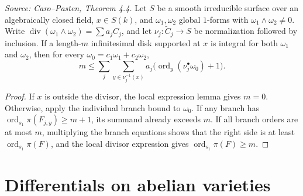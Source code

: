\begin{theorem}
  \label{thm:cp_overdetermined_bound}
  \textit{Source: Caro--Pasten, Theorem 4.4.}
  Let \(S\) be a smooth irreducible surface over an algebraically closed field,
  \(x\in S(k)\), and \(\omega_1,\omega_2\) global \(1\)-forms with
  \(\omega_1\wedge\omega_2\ne0\).  Write
  \(\operatorname{div}(\omega_1\wedge\omega_2)=\sum a_jC_j\), and let
  \(\nu_j:\widetilde C_j\to S\) be normalization followed by inclusion.  If
  a length-\(m\) infinitesimal disk supported at \(x\) is integral for both
  \(\omega_1\) and \(\omega_2\), then for every
  \(\omega_0=c_1\omega_1+c_2\omega_2\),
  \[
    m\le \sum_j\sum_{y\in\nu_j^{-1}(x)}
      a_j\bigl(\operatorname{ord}_y(\nu_j^\bullet\omega_0)+1\bigr).
  \]
\end{theorem}
\begin{proof}
  If \(x\) is outside the divisor, the local expression lemma gives \(m=0\).
  Otherwise, apply the individual branch bound to \(\omega_0\).  If any branch
  has \(\operatorname{ord}_{s_1}\pi(F_{j,y})\ge m+1\), its summand already
  exceeds \(m\).  If all branch orders are at most \(m\), multiplying the
  branch equations shows that the right side is at least
  \(\operatorname{ord}_{s_1}\pi(F)\), and the local divisor expression gives
  \(\operatorname{ord}_{s_1}\pi(F)\ge m\).
\end{proof}

\section{Differentials on abelian varieties}

